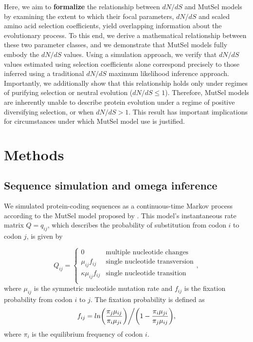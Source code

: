 \documentclass[11pt]{article}
\begin{document}
Here, we aim to \textbf{formalize} the relationship between $dN/dS$ and MutSel models by examining the extent to which their focal parameters, $dN/dS$ and scaled amino acid selection coefficients, yield overlapping information about the evolutionary process. To this end, we derive a mathematical relationship between these two parameter classes, and we demonstrate that MutSel models fully embody the $dN/dS$ values. Using a simulation approach, we verify that $dN/dS$ values estimated using selection coefficients alone correspond precisely to those inferred using a traditional $dN/dS$ maximum likelihood inference approach.  Importantly, we additionally show that this relationship holds only under regimes of purifying selection or neutral evolution ($dN/dS \leq 1$). Therefore, MutSel models are inherently unable to describe protein evolution under a regime of positive diversifying selection, or when $dN/dS > 1$. This result has important implications for circumstances under which MutSel model use is justified.


\section*{Methods}

\subsection*{Sequence simulation and omega inference}
We simulated protein-coding sequences as a continuous-time Markov
process \cite{Yang2006} according to the MutSel model proposed by \cite{HalpernBruno1998}. This model's instantaneous rate matrix $Q = q_{ij}$, which describes the probability of substitution from codon $i$ to codon $j$, is given by 

\begin{equation}
Q_{ij} = \left\{ \begin{array}{rl}
              0                                           &\mbox{multiple nucleotide changes} \\
              \mu_{ij}f_{ij}                          &\mbox{single nucleotide transversion} \\
              \kappa\mu_{ij}f_{ij}               &\mbox{single nucleotide transition} \\
         \end{array} \right.,
\end{equation} where $\mu_{ij}$ is the symmetric nucleotide mutation rate and $f_{ij}$ is the fixation probability from codon $i$ to $j$. The fixation probability is defined as \begin{equation}f_{ij} = ln\bigg{(}\frac{\pi_j\mu_{ij}}{\pi_i\mu_{ji}}\bigg{)}\bigg{/}\bigg{(}1 - \frac{\pi_i\mu_{ji}}{\pi_j\mu_{ij}}\bigg{)},\end{equation} where $\pi_i$ is the equilibrium frequency of codon $i$.
\end{document}
